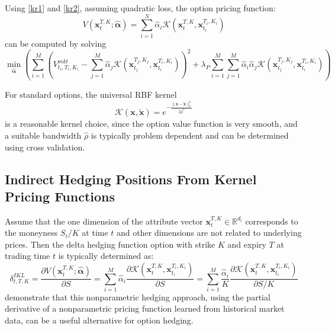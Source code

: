 \documentclass[letterpaper,12pt,titlepage,oneside,final]{book}
\numberwithin{equation}{section}
\theoremstyle{definition}
\newcommand{\vx}{\mathbf{x}}
\newcommand{\Real}{\mathbb{R}}
\newcommand{\valpha}{\pmb{\widehat{\alpha}}}
\newcommand{\Vmkt}{V^{mkt}}
\begin{document}
Using \eqref{kr1} and \eqref{kr2}, assuming quadratic loss, the option pricing function:
\[
	V(\vx_{t}^{T,K};\mathbf{\widehat{\alpha}})=\sum_{i=1}^N \widehat{\alpha}_i \mathcal{K}(\vx_{t}^{T,K},\vx_{t_i}^{T_i,K_i})
\] can be computed by solving
\begin{equation}
\min_{\mathbf{\widehat{\alpha}}} \left(  \sum_{i=1}^M \left( \Vmkt_{t_i,T_i,K_i}-\sum_{j=1}^M \widehat{\alpha}_j \mathcal{K}(\vx_{t_j}^{T_j,K_j},\vx_{t_i}^{T_i,K_i}) \right)^2+\lambda_P \sum_{i=1}^M\sum_{j=1}^M  \widehat{\alpha}_i \widehat{\alpha}_j \mathcal{K}(\vx_{t_j}^{T_j,K_j},\vx_{t_i}^{T_i,K_i})\right)
\label{eq:indirectf}
\end{equation}


For standard options, the universal RBF kernel
\begin{equation} \label{eq:RBF}
\mathcal{K}(\vx,\tilde{\vx})=e^{-\frac{\|\vx-\tilde{\vx}\|_2^2}{2 \hat{\rho}^2}}
\end{equation}
is a reasonable kernel choice, since the option value function is very smooth, and
a suitable bandwidth $\hat{\rho}$ is typically problem dependent and can be determined using cross validation.


\subsection{Indirect Hedging Positions From Kernel Pricing Functions} \label{sec:VF}

Assume that the one dimension  of the attribute vector $\vx_{t}^{T,K} \in \Real^{d_l}$ corresponds to the moneyness $S_t/K$ at time $t$ and other dimensions are not related to underlying prices. Then the delta hedging function option with strike $K$ and expiry $T$ at trading time $t$ is typically determined as:
\begin{equation}\label{eq:dV}
	\delta^{IKL}_{t,T,K}=
\frac{\partial V(\mathbf{x}_{t}^{T,K};\valpha)}{\partial S}=\sum_{i=1}^M  \widehat{\alpha}_i\frac{\partial \mathcal{K}(\mathbf{x}_{t}^{T,K},\vx_{t_i}^{T_i,K_i})}{\partial S} = \sum_{i=1}^M  \frac{\widehat{\alpha}_i}{K} \frac{\partial \mathcal{K}(\mathbf{x}_{t}^{T,K},\vx_{t_i}^{T_i,K_i})}{\partial S/K} 
\end{equation}
\citet{hutchinson} demonstrate that this nonparametric hedging approach,  using the partial derivative of a nonparametric pricing function learned from historical market data, can be a useful alternative for option hedging.
\end{document}
